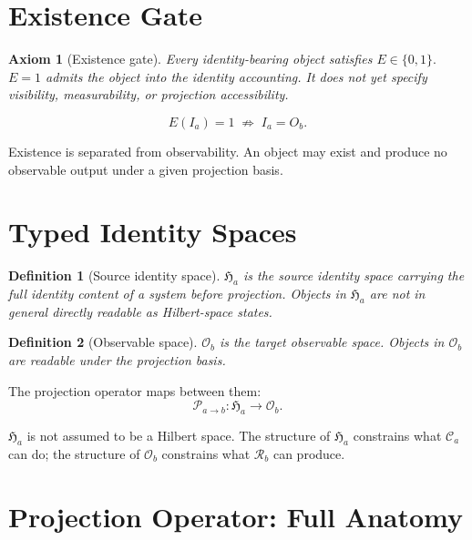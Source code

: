 \documentclass[11pt,a4paper,oneside]{article}
\newtheorem{definition}{Definition}[section]
\newtheorem{axiom}{Axiom}[section]
\newcommand{\Ia}{I_a}
\newcommand{\Ha}{\mathfrak{H}_a}
\newcommand{\Osp}{\mathcal{O}_b}
\newcommand{\Pab}{\mathcal{P}_{a\to b}}
\newcommand{\Ca}{\mathcal{C}_a}
\newcommand{\Rb}{\mathcal{R}_b}
\begin{document}
\section{Existence Gate}

\begin{axiom}[Existence gate]
Every identity-bearing object satisfies
$E \in \{0,1\}.$
$E = 1$ admits the object into the identity accounting.
It does not yet specify visibility, measurability, or projection accessibility.
\end{axiom}

\[
E(\Ia) = 1 \;\not\Rightarrow\; \Ia = O_b.
\]

Existence is separated from observability. An object may exist and produce no observable output under a given projection basis.

\section{Typed Identity Spaces}

\begin{definition}[Source identity space]
$\Ha$ is the source identity space carrying the full identity content of a system before projection. Objects in $\Ha$ are not in general directly readable as Hilbert-space states.
\end{definition}

\begin{definition}[Observable space]
$\Osp$ is the target observable space. Objects in $\Osp$ are readable under the projection basis.
\end{definition}

The projection operator maps between them:
\[
\Pab : \Ha \longrightarrow \Osp.
\]

$\Ha$ is not assumed to be a Hilbert space. The structure of $\Ha$ constrains what $\Ca$ can do; the structure of $\Osp$ constrains what $\Rb$ can produce.

\section{Projection Operator: Full Anatomy}
\end{document}
